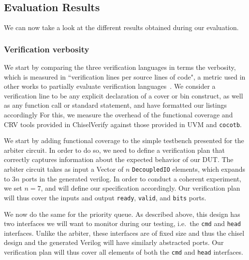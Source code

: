 \documentclass[conference]{IEEEtran}
\begin{document}
\subsection{Evaluation Results}
We can now take a look at the different results obtained during our evaluation.
\subsubsection{Verification verbosity}
We start by comparing the three verification languages in terms the verbosity, which is measured in ``verification lines per source lines of code", a metric used in other works to partially evaluate verification languages~\cite{Nagini:2018, MuellerSchwerhoffSummers16, dobisCoverage:ETS22}.
We consider a verification line to be any explicit declaration of a cover or bin construct, as well as any function call or standard statement, and have formatted our listings accordingly
For this, we measure the overhead of the functional coverage and CRV tools provided in ChiselVerify against those provided in UVM and \texttt{cocotb}.

We start by adding functional coverage to the simple testbench presented for the arbiter circuit. 
In order to do so, we need to define a verification plan that correctly captures information about the expected behavior of our DUT.
The arbiter circuit takes as input a Vector of $n$ \texttt{DecoupledIO} elements, which expands to $3n$ ports in the generated verilog.
In order to conduct a coherent experiment, we set $n = 7$, and will define our specification accordingly.
Our verification plan will thus cover the inputs and output \texttt{ready}, \texttt{valid}, and \texttt{bits} ports.

We now do the same for the priority queue. 
As described above, this design has two interfaces we will want to monitor during our testing, i.e.\ the \texttt{cmd} and \texttt{head} interfaces.
Unlike the arbiter, these interfaces are of fixed size and thus the chisel design and the generated Verilog will have similarly abstracted ports.
Our verification plan will thus cover all elements of both the \texttt{cmd} and \texttt{head} interfaces.
 
\end{document}
